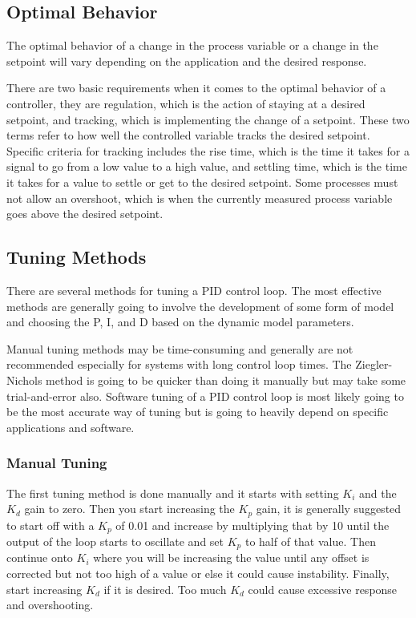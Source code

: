 \documentclass[10pt,conference]{IEEEtran}
\begin{document}
\subsection{Optimal Behavior}

The optimal behavior of a change in the process variable or a change in the setpoint will
vary depending on the application and the desired response.

There are two basic requirements when it comes to the optimal behavior of a controller, they
are regulation, which is the action of staying at a desired setpoint, and tracking, which
is implementing the change of a setpoint. These two terms refer to how well the controlled
variable tracks the desired setpoint. Specific criteria for tracking includes the rise
time, which is the time it takes for a signal to go from a low value to a high value, and
settling time, which is the time it takes for a value to settle or get to the desired
setpoint. Some processes must not allow an overshoot, which is when the currently
measured process variable goes above the desired setpoint.

\subsection{Tuning Methods}

There are several methods for tuning a PID control loop. The most effective methods are
generally going to involve the development of some form of model and choosing the
P, I, and D based on the dynamic model parameters.

Manual tuning methods may be time-consuming and generally are not recommended especially
for systems with long control loop times. The Ziegler-Nichols method is going to be
quicker than doing it manually but may take some trial-and-error also. Software tuning
of a PID control loop is most likely going to be the most accurate way of tuning but
is going to heavily depend on specific applications and software.

\subsubsection{Manual Tuning}

The first tuning method is done manually and it starts with setting \(K_i\) and the \(K_d\)
gain to zero. Then you start increasing the \(K_p\) gain, it is generally suggested to start
off with a \(K_p\) of 0.01 and increase by multiplying that by 10 until the output of the
loop starts to oscillate and set \(K_p\) to half of that value. Then continue onto \(K_i\)
where you will be increasing the value until any offset is corrected but not too high of
a value or else it could cause instability. Finally, start increasing \(K_d\) if it is
desired. Too much \(K_d\) could cause excessive response and overshooting.
\end{document}
